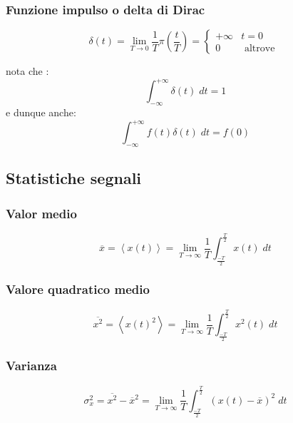 \subsubsection*{Funzione impulso o delta di Dirac}
\begin{minipage}[c]{0.48\textwidth}
	\[
		\delta \left(t\right) = \lim_{T \to 0} \frac{1}{T} \pi \left(\frac{t}{T}\right) =
		\begin{cases}
			+ \infty & t = 0            \\
			0        & \text{ altrove }
		\end{cases}
	\]

	nota che :
	\[
		\int_{-\infty }^{+ \infty } \delta \left(t\right) \; dt = 1
	\]
	e dunque anche:
	\[
		\int_{-\infty }^{+ \infty } f\left(t\right)\delta \left(t\right) \; dt = f\left(0\right)
	\]
\end{minipage}
%
\begin{minipage}[c]{0.48\textwidth}
\end{minipage}
\newpage
\subsection{Statistiche segnali}
\subsubsection*{Valor medio}
\[
	\overline{x} = \left<x\left(t\right)\right> = \lim_{T \to \infty} \frac{1}{T} \int_{\frac{-T}{2}}^{\frac{T}{2}} x\left(t\right) \; dt
\]
\subsubsection*{Valore quadratico medio}
\[
	\overline{x^2 } = \left<x\left(t\right)^2 \right> = \lim_{T \to \infty} \frac{1}{T} \int_{\frac{-T}{2}}^{\frac{T}{2}} x^2 \left(t\right) \; dt
\]

\subsubsection*{Varianza}
\[
	\sigma_x ^2  = \overline{x^2 } - \overline{x}^2 = \lim_{T \to \infty} \frac{1}{T}\int_{\frac{-T}{2}}^{\frac{T}{2}} \left(x\left(t\right)- \overline{x}\right)^2  \; dt
\]
